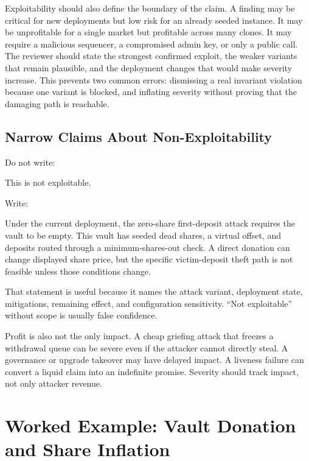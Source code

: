 Exploitability should also define the boundary of the claim. A finding may be critical for new deployments but low risk for an already seeded instance. It may be unprofitable for a single market but profitable across many clones. It may require a malicious sequencer, a compromised admin key, or only a public call. The reviewer should state the strongest confirmed exploit, the weaker variants that remain plausible, and the deployment changes that would make severity increase. This prevents two common errors: dismissing a real invariant violation because one variant is blocked, and inflating severity without proving that the damaging path is reachable.

\subsection{Narrow Claims About Non-Exploitability}

Do not write:

\begin{codeblock}
This is not exploitable.
\end{codeblock}

Write:

\begin{codeblock}
Under the current deployment, the zero-share first-deposit attack
requires the vault to be empty. This vault has seeded dead shares,
a virtual offset, and deposits routed through a minimum-shares-out
check. A direct donation can change displayed share price, but the
specific victim-deposit theft path is not feasible unless those
conditions change.
\end{codeblock}

That statement is useful because it names the attack variant, deployment state, mitigations, remaining effect, and configuration sensitivity. ``Not exploitable'' without scope is usually false confidence.

Profit is also not the only impact. A cheap griefing attack that freezes a withdrawal queue can be severe even if the attacker cannot directly steal. A governance or upgrade takeover may have delayed impact. A liveness failure can convert a liquid claim into an indefinite promise. Severity should track impact, not only attacker revenue.

\section{Worked Example: Vault Donation and Share Inflation}

